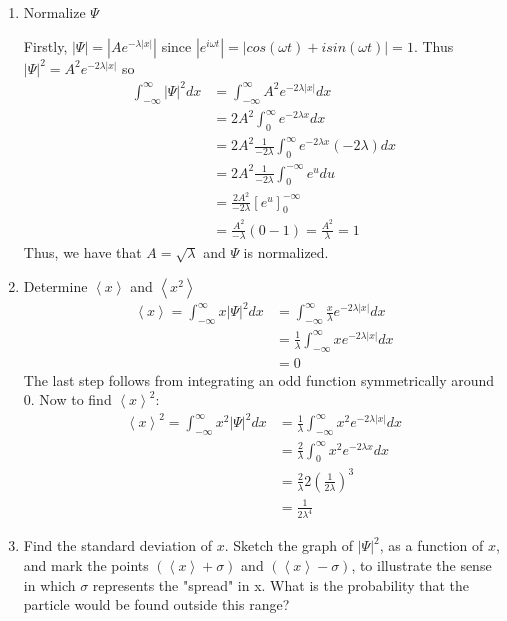 \documentclass{article}
\newcommand{\braket}[1]{\left\langle #1 \right\rangle}
\newcommand{\intinf}{\int_{-\infty}^\infty}
\newcommand{\intzinf}{\int_{0}^\infty}
\begin{document}
  \begin{enumerate}[label=(\alph*)]
    \item Normalize $\Psi$

      Firstly, $|\Psi| = |Ae^{-\lambda|x|}|$ since $|e^{i\omega t}| = |cos(\omega t) + i sin(\omega t)| = 1$.
      Thus $|\Psi|^2 = A^2 e^{-2\lambda|x|}$ so
      \begin{align*}
        \intinf |\Psi|^2 dx &= \intinf A^2 e^{-2\lambda |x|} dx \\
                            &= 2A^2 \intzinf e^{-2 \lambda x} dx \\
                            &= 2A^2 \frac{1}{-2\lambda} \intzinf e^{-2 \lambda x} (-2 \lambda) dx \\
                            &= 2A^2 \frac{1}{-2\lambda} \int_{0}^{-\infty} e^{u}du \\
                            &= \frac{2A^2}{-2 \lambda} [e^u]_0^{-\infty} \\
                            &= \frac{A^2}{-\lambda} (0 - 1) = \frac{A^2}{\lambda} = 1
      \end{align*}
      Thus, we have that $A = \sqrt{\lambda}$ and $\Psi$ is normalized.

    \item Determine $\braket{x}$ and $\braket{x^2}$
      \begin{align*}
        \braket{x} = \intinf x|\Psi|^2 dx &= \intinf \frac{x}{\lambda} e^{-2\lambda|x|}dx \\
                             &= \frac1\lambda \intinf x e^{-2 \lambda |x|} dx \\
                             &= 0 
      \end{align*}
      The last step follows from integrating an odd function symmetrically around 0. Now to find $\braket{x}^2$:
      \begin{align*}
        \braket{x}^2 = \intinf x^2|\Psi|^2 dx &= \frac1\lambda \intinf x^2 e^{-2\lambda|x|}dx \\
                                              &= \frac2\lambda \intzinf x^2 e^{-2\lambda x} dx \\
                                              &= \frac2\lambda 2 (\frac1{2\lambda})^3 \\
                                              &= \frac1{2\lambda ^4} 
      \end{align*}

    \item Find the standard deviation of $x$. 
      Sketch the graph of $|\Psi|^2$, as a function of $x$, and mark the points $(\braket{x} + \sigma)$ and $(\braket{x} - \sigma)$, to illustrate the sense in which $\sigma$ represents the "spread" in x.
      What is the probability that the particle would be found outside this range?


\end{enumerate}
\end{document}
